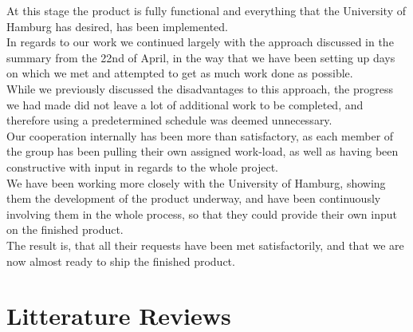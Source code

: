 \documentclass[12pt,a4paper]{article}
\begin{document}
At this stage the product is fully functional and everything that the University of Hamburg has desired, has been implemented.\\
In regards to our work we continued largely with the approach discussed in the summary from the 22nd of April, in the way that we have been setting up days on which we met and attempted to get as much work done as possible.\\
While we previously discussed the disadvantages to this approach, the progress we had made did not leave a lot of additional work to be completed, and therefore using a predetermined schedule was deemed unnecessary.\\
Our cooperation internally has been more than satisfactory, as each member of the group has been pulling their own assigned work-load, as well as having been constructive with input in regards to the whole project.\\
We have been working more closely with the University of Hamburg, showing them the development of the product underway, and have been continuously involving them in the whole process, so that they could provide their own input on the finished product.\\
The result is, that all their requests have been met satisfactorily, and that we are now almost ready to ship the finished product.

\newpage
\section{Litterature Reviews}
\end{document}
